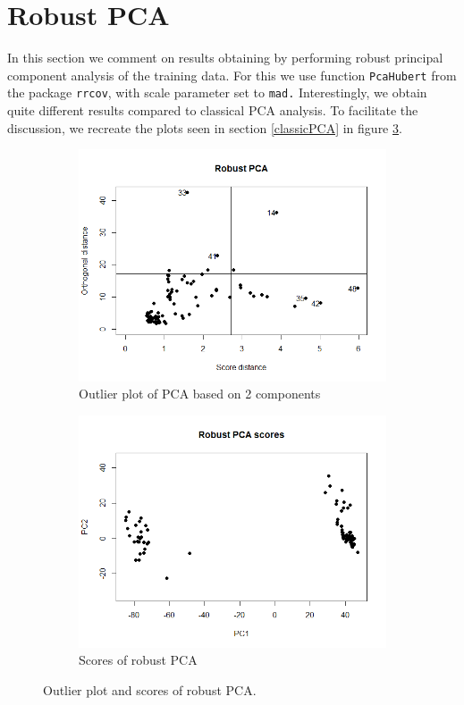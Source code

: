 \documentclass[12pt]{article}
\begin{document}
\section{Robust PCA}
In this section we comment on results obtaining by performing robust principal component analysis of the training data. For this we use function \texttt{PcaHubert} from the
package \texttt{rrcov}, with scale parameter set to \texttt{mad.} Interestingly, we obtain quite different results compared to classical PCA analysis. To facilitate
the discussion, we recreate the plots seen in section \ref{classicPCA} in figure \ref{robust}.

\begin{figure}[h!]
  \begin{subfigure}[b]{0.5\linewidth}
      \centering
      \includegraphics[width=\textwidth]{../images/project1/robustPCAoutliers.png}
   \caption{Outlier plot of PCA based on 2 components}\label{fig:robustOutliers}
  \end{subfigure}%
  \begin{subfigure}[b]{0.5\linewidth}
      \centering
   \includegraphics[width=\textwidth]{../images/project1/robustPCAscores.png}
   \caption{Scores of robust PCA}\label{fig:scoresRobust}
  \end{subfigure}%
 \caption{Outlier plot and scores of robust PCA.}
 \label{robust}
\end{figure} 
\end{document}
